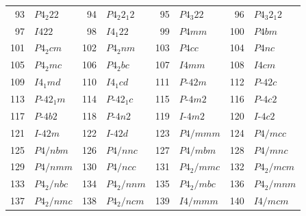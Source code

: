 \documentclass[12pt]{article}
\begin{document}
\begin{center}
{\begin{tabular}{|r|l||r|l||r|l||r|l|}
  93 & $P4_{2}22$                             &  94 & $P4_{2}2_{1}2$                         &  95 & $P4_{3}22$                             &  96 & $P4_{3}2_{1}2$                         \\
  97 & $I422$                                 &  98 & $I4_{1}22$                             &  99 & $P4mm$                                 & 100 & $P4bm$                                 \\
 101 & $P4_{2}cm$                             & 102 & $P4_{2}nm$                             & 103 & $P4cc$                                 & 104 & $P4nc$                                 \\
 105 & $P4_{2}mc$                             & 106 & $P4_{2}bc$                             & 107 & $I4mm$                                 & 108 & $I4cm$                                 \\
 109 & $I4_{1}md$                             & 110 & $I4_{1}cd$                             & 111 & $P\mbox{-}42m$                         & 112 & $P\mbox{-}42c$                         \\
 113 & $P\mbox{-}42_{1}m$                     & 114 & $P\mbox{-}42_{1}c$                     & 115 & $P\mbox{-}4m2$                         & 116 & $P\mbox{-}4c2$                         \\
 117 & $P\mbox{-}4b2$                         & 118 & $P\mbox{-}4n2$                         & 119 & $I\mbox{-}4m2$                         & 120 & $I\mbox{-}4c2$                         \\
 121 & $I\mbox{-}42m$                         & 122 & $I\mbox{-}42d$                         & 123 & $P4/mmm$                               & 124 & $P4/mcc$                               \\
 125 & $P4/nbm$                               & 126 & $P4/nnc$                               & 127 & $P4/mbm$                               & 128 & $P4/mnc$                               \\
 129 & $P4/nmm$                               & 130 & $P4/ncc$                               & 131 & $P4_{2}/mmc$                           & 132 & $P4_{2}/mcm$                           \\
 133 & $P4_{2}/nbc$                           & 134 & $P4_{2}/nnm$                           & 135 & $P4_{2}/mbc$                           & 136 & $P4_{2}/mnm$                           \\
 137 & $P4_{2}/nmc$                           & 138 & $P4_{2}/ncm$                           & 139 & $I4/mmm$                               & 140 & $I4/mcm$                               \\

\end{tabular}}
\end{center}
\end{document}
